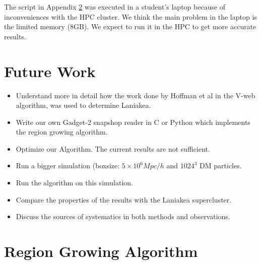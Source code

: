 \documentclass[12pt]{article}
\begin{document}
The script in Appendix \ref{App:AppendixA} was executed in a student's
laptop because of inconveniences with the HPC cluster. We think the main
problem in the laptop is the limited memory (8GB). We expect to run it in the
HPC to get more accurate results.

\section{Future Work}
\begin{itemize}
	\item Understand more in detail how the work done by Hoffman et al\cite{hoffman_kinematic_2012} in the V-web algorithm, was used to determine Laniakea.
    \item Write our own Gadget-2 snapshop reader in C or Python which implements the region growing algorithm.
    \item Optimize our Algorithm. The current results are not sufficient.
    \item Run a bigger simulation (boxsize: $5 \times 10^{6} Mpc/h$ and $1024^3$ DM particles.
    \item Run the algorithm on this simulation.
    \item Compare the properties of the results with the Laniakea supercluster.
    \item Discuss the sources of systematics in both methods and observations.
\end{itemize}





\renewcommand\refname{Referencias}


\appendix
\section{Region Growing Algorithm} \label{App:AppendixA}
\end{document}

